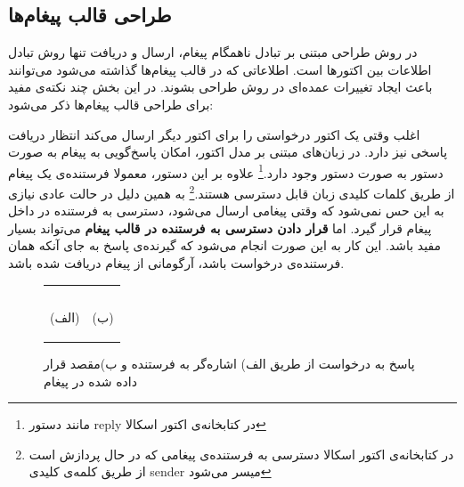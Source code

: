\subsection{طراحی قالب پیغام‌ها}
در روش طراحی مبتنی بر تبادل ناهمگام پیغام، ارسال و دریافت تنها روش تبادل اطلاعات بین اکتورها است. اطلاعاتی که در قالب پیغام‌ها گذاشته می‌شود می‌توانند باعث ایجاد تغییرات عمده‌ای در روش طراحی بشوند. در این بخش چند نکته‌ی مفید برای طراحی قالب پیغام‌ها ذکر می‌شود:\\
\begin{enumerate}
\itme اغلب وقتی یک اکتور درخواستی را برای اکتور دیگر ارسال می‌کند انتظار دریافت پاسخی نیز دارد. در زبان‌های مبتنی بر مدل اکتور، امکان پاسخ‌گویی به پیغام به صورت دستور به صورت دستور وجود دارد.\footnote{مانند دستور reply در کتابخانه‌ی اکتور اسکالا}  علاوه بر این دستور، معمولا فرستنده‌ی یک پیغام از طریق کلمات کلیدی زبان قابل دسترسی هستند.\footnote{ در کتابخانه‌ی اکتور اسکالا دسترسی به فرستنده‌ی پیغامی که در حال پردازش است از طریق کلمه‌ی کلیدی sender میسر می‌شود} به همین دلیل در حالت عادی نیازی به این حس نمی‌شود که وقتی پیغامی ارسال می‌شود،‌ دسترسی به فرستنده در داخل پیغام قرار گیرد. اما \textbf{قرار دادن دسترسی به فرستنده در قالب پیغام} می‌تواند بسیار مفید باشد. این کار به این صورت انجام می‌شود که گیرنده‌ی پاسخ به جای آنکه همان فرستنده‌ی درخواست باشد، آرگومانی از پیغام دریافت شده باشد.
\begin{figure}
    \begin{center}
    \begin{tabular}{|m{6cm}|m{6cm}|}
      	\hline
	 & \\
	\begin{latin}
\linespread{1.1}

\end{latin} & 
 \begin{latin}
	\linespread{1.1}
		
\end{latin}
 	\\
	\begin{center}(الف)\end{center}       &  \begin{center} (ب)\end{center}            \\
	\hline
    \end{tabular}
    \end{center}
    \caption{\label{fig:target_in_message}  پاسخ به درخواست از طریق الف) اشاره‌گر به فرستنده و ب)مقصد قرار داده شده در پیغام}
\end{figure}


\end{enumerate}
